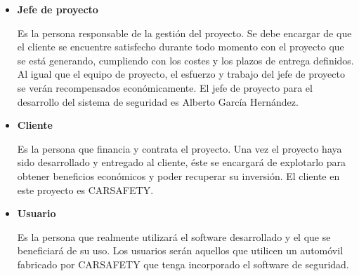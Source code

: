 \begin{itemize}[-]
\begin{itemize}[-]
\end{itemize}
\item \textbf{Jefe de proyecto}
\par Es la persona responsable de la gestión del proyecto. Se debe encargar de que el cliente se encuentre satisfecho durante todo momento con el proyecto que se está generando, cumpliendo con los costes y los plazos de entrega definidos. Al igual que el equipo de proyecto, el esfuerzo y trabajo del jefe de proyecto se verán recompensados económicamente. El jefe de proyecto para el desarrollo del sistema de seguridad es Alberto García Hernández.
\item \textbf{Cliente}
\par Es la persona que financia y contrata el proyecto. Una vez el proyecto haya sido desarrollado y entregado al cliente, éste se encargará de explotarlo para obtener beneficios económicos y poder recuperar su inversión. El cliente en este proyecto es CARSAFETY.
\item \textbf{Usuario}
\par Es la persona que realmente utilizará el software desarrollado y el que se beneficiará de su uso. Los usuarios serán aquellos que utilicen un automóvil fabricado por CARSAFETY que tenga incorporado el software de seguridad.
\end{itemize}
